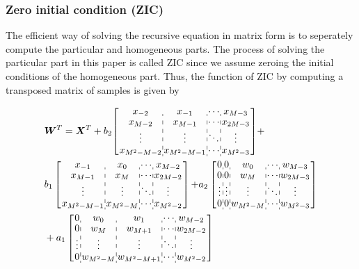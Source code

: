 \subsubsection{Zero initial condition (ZIC)}

The efficient way of solving the recursive equation in matrix form is to seperately compute
the particular and homogeneous parts. The process of solving the particular part in this paper is called
ZIC since we assume zeroing the initial conditions of the homogeneous part. 
Thus, the function of ZIC by computing a transposed matrix of samples is given by

\begin{equation}
    \label{eq:ZIC}
    \begin{aligned}
        &\bm{W}^T = \bm{X}^T 
        + b_2{\left[\arraycolsep=0.9pt\def\arraystretch{0.9}
        \begin{array}{c:c:c:c}
        x_{-2} & x_{-1} & \cdots & x_{M-3} \\ 
        x_{M-2} & x_{M-1} & \cdots & x_{2M-3} \\
        \vdots & \vdots & \ddots & \vdots \\
        x_{M^2-M-2} & x_{M^2-M-1} & \cdots & x_{M^2-3} \\
        \end{array}\right]} + \\ 
        & b_1\left[\arraycolsep=0.9pt\def\arraystretch{0.9}
        \begin{array}{c:c:c:c}
        x_{-1} & x_0 & \cdots & x_{M-2} \\ 
        x_{M-1} & x_M & \cdots & x_{2M-2} \\
        \vdots & \vdots & \ddots & \vdots \\
        x_{M^2-M-1} & x_{M^2-M} & \cdots & x_{M^2-2} \\
        \end{array}\right]
        {+} a_2\left[\arraycolsep=0.9pt\def\arraystretch{0.9}
                \begin{array}{c:c:c:c:c}
                0 & 0 & w_0 & \cdots & w_{M-3} \\ 
                0 & 0 & w_M & \cdots & w_{2M-3} \\
                \vdots & \vdots & \vdots & \ddots & \vdots \\
                0 & 0 & w_{M^2-M} & \cdots & w_{M^2-3} \\
                \end{array}\right] \\
        &+ a_1\left[\arraycolsep=0.9pt\def\arraystretch{0.9}
            \begin{array}{c:c:c:c:c}
            0 & w_0 & w_1 & \cdots & w_{M-2} \\ 
            0 & w_M & w_{M+1} & \cdots & w_{2M-2} \\
            \vdots & \vdots & \vdots & \ddots & \vdots \\
            0 & w_{M^2-M} & w_{M^2-M+1} & \cdots & w_{M^2-2} \\
            \end{array}\right]
    \end{aligned}
\end{equation}
